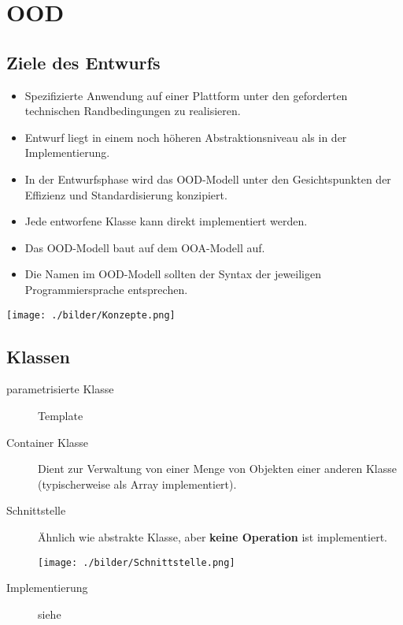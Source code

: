 \section{OOD }
\subsection{Ziele des Entwurfs}
  \begin{itemize}[leftmargin=0.5cm]
    \item Spezifizierte Anwendung auf einer Plattform unter den geforderten technischen Randbedingungen zu realisieren.
    \item Entwurf liegt in einem noch höheren Abstraktionsniveau als in der Implementierung.
    \item In der Entwurfsphase wird das OOD-Modell unter den Gesichtspunkten
      der Effizienz und Standardisierung konzipiert.
    \item Jede entworfene Klasse kann direkt implementiert werden.
    \item Das OOD-Modell baut auf dem OOA-Modell auf.
    \item Die Namen im OOD-Modell sollten der Syntax der jeweiligen Programmiersprache entsprechen.
  \end{itemize}

  \parbox{9cm}{\texttt{[image: ./bilder/Konzepte.png]}}
  
\subsection{Klassen }
  \begin{description}
    \item[parametrisierte Klasse]
      Template
    \item[Container Klasse]
      Dient zur Verwaltung von einer Menge von Objekten einer anderen Klasse
      (typischerweise als Array implementiert).
    \item[Schnittstelle ]
      \parbox{5cm}{Ähnlich wie abstrakte Klasse, aber \textbf{keine Operation} ist implementiert.}
      \hspace{0.5cm}
      \parbox{7cm}{\texttt{[image: ./bilder/Schnittstelle.png]}}
    \item[Implementierung]
      siehe 
  \end{description}
  

